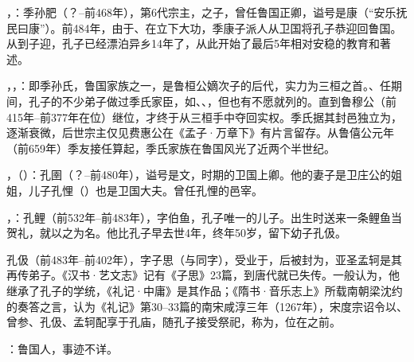，：季孙肥（？--前468年），第6代宗主，之子，曾任鲁国正卿，谥号是康（“安乐抚民曰康”）。前484年，由于、在立下大功，季康子派人从卫国将孔子恭迎回鲁国。从到子迎，孔子已经漂泊异乡14年了，从此开始了最后5年相对安稳的教育和著述。

，，：即季孙氏，鲁国家族之一，是鲁桓公嫡次子的后代，实力为三桓之首。、任期间，孔子的不少弟子做过季氏家臣，如、、，但也有不愿就列的。直到鲁穆公（前415年--前377年在位）继位，才终于从三桓手中夺回实权。季氏据其封邑独立为，逐渐衰微，后世宗主仅见费惠公在《孟子·万章下》有片言留存。从鲁僖公元年（前659年）季友接任算起，季氏家族在鲁国风光了近两个半世纪。

，（）：孔圉（？--前480年），谥号是文，时期的卫国上卿。他的妻子是卫庄公的姐姐，儿子孔悝（）也是卫国大夫。曾任孔悝的邑宰。

，：孔鲤（前532年--前483年），字伯鱼，孔子唯一的儿子。出生时送来一条鲤鱼当贺礼，就以之为名。他比孔子早去世4年，终年50岁，留下幼子孔伋。

孔伋（前483年--前402年），字子思（与同字），受业于，后被封为，亚圣孟轲是其再传弟子。《汉书·艺文志》记有《子思》23篇，到唐代就已失传。一般认为，他继承了孔子的学统，《礼记·中庸》是其作品；《隋书·音乐志上》所载南朝梁沈约的奏答之言，认为《礼记》第30--33篇的南宋咸淳三年（1267年），宋度宗诏令以、曾参、孔伋、孟轲配享于孔庙，随孔子接受祭祀，称为，位在之前。

：鲁国人，事迹不详。%

